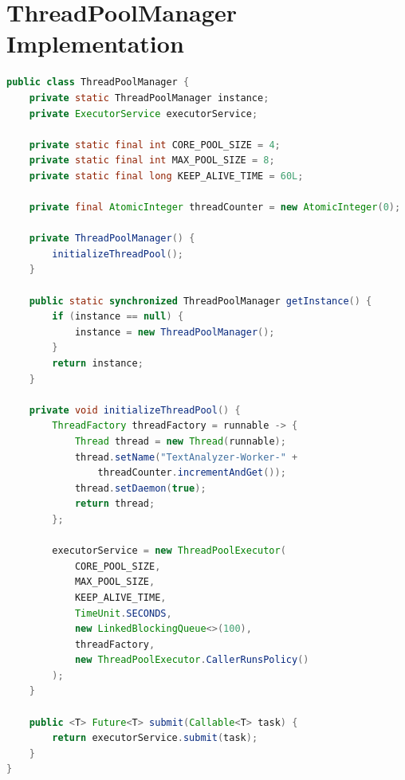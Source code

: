 \documentclass[12pt,a4paper]{report}
\begin{document}
\section{ThreadPoolManager Implementation}
\begin{lstlisting}[language=Java, caption=ThreadPoolManager Singleton]
public class ThreadPoolManager {
    private static ThreadPoolManager instance;
    private ExecutorService executorService;
    
    private static final int CORE_POOL_SIZE = 4;
    private static final int MAX_POOL_SIZE = 8;
    private static final long KEEP_ALIVE_TIME = 60L;
    
    private final AtomicInteger threadCounter = new AtomicInteger(0);
    
    private ThreadPoolManager() {
        initializeThreadPool();
    }
    
    public static synchronized ThreadPoolManager getInstance() {
        if (instance == null) {
            instance = new ThreadPoolManager();
        }
        return instance;
    }
    
    private void initializeThreadPool() {
        ThreadFactory threadFactory = runnable -> {
            Thread thread = new Thread(runnable);
            thread.setName("TextAnalyzer-Worker-" + 
                threadCounter.incrementAndGet());
            thread.setDaemon(true);
            return thread;
        };
        
        executorService = new ThreadPoolExecutor(
            CORE_POOL_SIZE,
            MAX_POOL_SIZE,
            KEEP_ALIVE_TIME,
            TimeUnit.SECONDS,
            new LinkedBlockingQueue<>(100),
            threadFactory,
            new ThreadPoolExecutor.CallerRunsPolicy()
        );
    }
    
    public <T> Future<T> submit(Callable<T> task) {
        return executorService.submit(task);
    }
}
\end{lstlisting}
\end{document}
